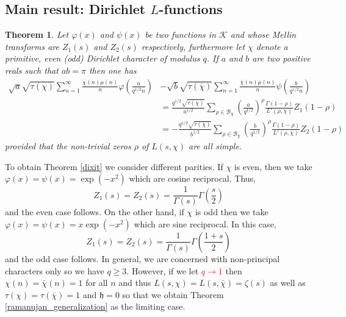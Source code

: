 \documentclass[11pt]{article}
\newtheorem{theorem}{Theorem}[section]
\numberwithin{equation}{section}		 			%
\numberwithin{figure}{section}			 			%
\begin{document}
\subsection{Main result: Dirichlet $L$-functions}
\begin{theorem} \label{main_theorem}
Let $\varphi(x)$ and $\psi(x)$ be two functions in $\mathcal{K}$ and whose Mellin transforms are $Z_1(s)$ and $Z_2(s)$ respectively, furthermore let $\chi$ denote a primitive, even (odd) Dirichlet character of modulus $q$. If $a$ and $b$ are two positive reals such that $ab = \pi$ then one has
\begin{align} \label{main_theorem_eq}
  \sqrt a \sqrt {\tau (\chi )} \sum\limits_{n = 1}^\infty  {\frac{{\chi (n)\mu (n)}}
{n}\varphi \left( {\frac{a}
{{q^{1/2} n}}} \right)}  &- \sqrt b \sqrt {\tau (\bar \chi )} \sum\limits_{n = 1}^\infty  {\frac{{\bar \chi (n)\mu (n)}}
{n}\psi \left( {\frac{b}
{{q^{1/2} n}}} \right)}  \nonumber \\
   &= \frac{{q^{1/2} \sqrt {\tau (\chi )} }}
{{a^{1/2} }}\sum\limits_{\rho \in \mathcal{B}_\chi}  {\left( {\frac{a}
{{q^{1/2} }}} \right)^\rho  \frac{{\Gamma (1 - \rho )}}
{{L'(\rho ,\chi )}}Z_1 (1 - \rho )}  \nonumber \\
   &=  - \frac{{q^{1/2} \sqrt {\tau (\bar \chi )} }}
{{b^{1/2} }}\sum\limits_{\rho \in \mathcal{B}_\chi}  {\left( {\frac{b}
{{q^{1/2} }}} \right)^\rho  \frac{{\Gamma (1 - \rho )}}
{{L'(\rho ,\bar \chi )}}Z_2 (1 - \rho )}  \nonumber 
\end{align}
provided that the non-trivial zeros $\rho$ of $L(s,\chi)$ are all simple. 
\end{theorem}
\noindent To obtain Theorem \eqref{dixit} we consider different parities. If $\chi$ is even, then we take $\varphi (x) = \psi (x) = \exp ( - x^2 )$ which are cosine reciprocal. Thus,
\[
Z_1 (s) = Z_2 (s) = \frac{1}{{\Gamma (s)}}\Gamma \left( {\frac{s}{2}} \right)
\]
and the even case follows. On the other hand, if $\chi$ is odd then we take $\varphi (x) = \psi (x) = x\exp ( - x^2 )$ which are sine reciprocal. In this case,
\[
Z_1 (s) = Z_2 (s) = \frac{1}
{{\Gamma (s)}}\Gamma \left( {\frac{{1 + s}}
{2}} \right)
\]
and the odd case follows. In general, we are concerned with non-principal characters only so we have $q \ge 3$. However, if we let \textcolor{red}{$q \to 1$} then $\chi(n) = \bar \chi(n) =1$ for all $n$ and thus $L(s,\chi)=L(s,\bar \chi)=\zeta(s)$ as well as $\tau(\chi)=\tau(\bar \chi)=1$ and $\mathfrak{h}=0$ so that we obtain Theorem \eqref{ramanujan_generalization} as the limiting case.
\end{document}
